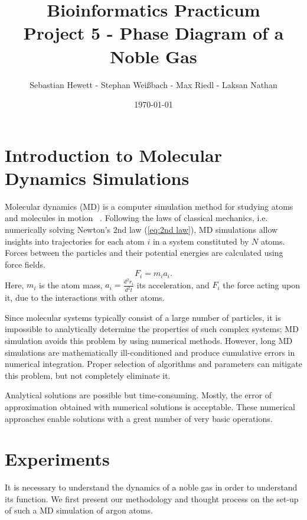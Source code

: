 \documentclass[10pt, a4paper, oneside, twocolumn]{article}
\title{Bioinformatics Practicum\\\textbf{Project 5 - Phase Diagram of a Noble Gas}}
\author{Sebastian Hewett - Stephan Weißbach - Max Riedl - Laksan Nathan}
\date{\today}
\begin{document}
\maketitle

\section{Introduction to Molecular Dynamics Simulations}

Molecular dynamics (MD) is a computer simulation method for studying atoms and molecules in motion ~\cite{Gonzalez}. Following the laws of classical mechanics, i.e. numerically solving Newton's 2nd law (\ref{eq:2nd law}), MD simulations allow insights into trajectories for each atom \(i\) in a system constituted by \(N\) atoms. Forces between the particles and their potential energies are calculated using force fields.
\begin{equation}\label{eq:2nd law}
F_i = m_i a_i.
\end{equation} %
Here, \(m_i\) is the atom mass, \(a_i = \frac{d^{2}r_i}{d^{2}t}\) its acceleration, and \(F_i\) the force acting upon it, due to the interactions with other atoms.

Since molecular systems typically consist of a large number of particles, it is impossible to analytically determine the properties of such complex systems; MD simulation avoids this problem by using numerical methods. However, long MD simulations are mathematically ill-conditioned and produce cumulative errors in numerical integration. Proper selection of algorithms and parameters can mitigate this problem, but not completely eliminate it.

Analytical solutions are possible but time-consuming. Mostly, the error of approximation obtained with numerical solutions is acceptable. These numerical approaches enable solutions with a great number of very basic operations.

\section{Experiments}

It is necessary to understand the dynamics of a noble gas in order to understand its function. We first present our methodology and thought process on the set-up of such a MD simulation of argon atoms.
\end{document}
